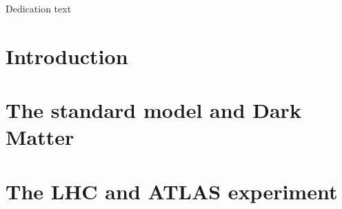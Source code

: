 \documentclass[11pt,openright,oneside,letterpaper,onecolumn]{report}  %
\begin{document}
\pagestyle{empty}

\thesistitlepage
\thesiscopyrightpage

\thesisabstract


\pagestyle{plain}

\setlength{\footskip}{0.5in}

\setcounter{tocdepth}{3}
\renewcommand{\contentsname}{Table of Contents}
\tableofcontents
\cleardoublepage

\listoffigures
\cleardoublepage

\listoftables
\cleardoublepage


\cleardoublepage

\thispagestyle{plain}
\strut \vfill
\centerline{\LARGE
Dedication text
}
\vfill \strut
\cleardoublepage


\pagestyle{headings}

%
%
\setlength{\textheight}{8.5in}
\setlength{\footskip}{0in}

 {%
\fancyhf{}
\fancyhead[LE,RO]{\thepage}
\fancyhead[RE,LO]{\itshape \leftmark}
\renewcommand{\headrulewidth}{0pt}
}
\pagestyle{plain}

\part{Introduction}
\label{sec:introduction}


\part{The standard model and Dark Matter}
\label{sec:theory-part}


\part{The LHC and ATLAS experiment}
\label{sec:experiment-part}

\end{document}
